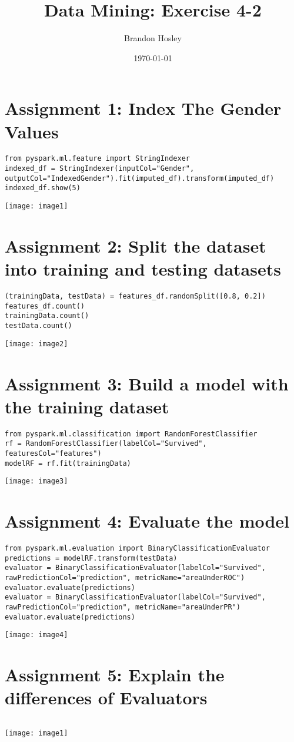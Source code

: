 \documentclass[]{article}
\title{Data Mining: Exercise 4-2}
\author{Brandon Hosley}
\date{\today}
\begin{document}
\maketitle

\section*{Assignment 1: Index The Gender Values}

\begin{verbatim}
from pyspark.ml.feature import StringIndexer
indexed_df = StringIndexer(inputCol="Gender", outputCol="IndexedGender").fit(imputed_df).transform(imputed_df)
indexed_df.show(5)
\end{verbatim}
\texttt{[image: image1]}


\section*{Assignment 2: Split the dataset into training and testing datasets}

\begin{verbatim}
(trainingData, testData) = features_df.randomSplit([0.8, 0.2])
features_df.count()
trainingData.count()
testData.count()
\end{verbatim}
\texttt{[image: image2]}


\section*{Assignment 3: Build a model with the training dataset}

\begin{verbatim}
from pyspark.ml.classification import RandomForestClassifier
rf = RandomForestClassifier(labelCol="Survived", featuresCol="features")
modelRF = rf.fit(trainingData)
\end{verbatim}
\texttt{[image: image3]}


\section*{Assignment 4: Evaluate the model}

\begin{verbatim}
from pyspark.ml.evaluation import BinaryClassificationEvaluator
predictions = modelRF.transform(testData)
evaluator = BinaryClassificationEvaluator(labelCol="Survived", rawPredictionCol="prediction", metricName="areaUnderROC")
evaluator.evaluate(predictions)
evaluator = BinaryClassificationEvaluator(labelCol="Survived", rawPredictionCol="prediction", metricName="areaUnderPR")
evaluator.evaluate(predictions)
\end{verbatim}
\texttt{[image: image4]}


\section*{Assignment 5: Explain the differences of Evaluators}

\begin{verbatim}

\end{verbatim}
\texttt{[image: image1]}
\end{document}
